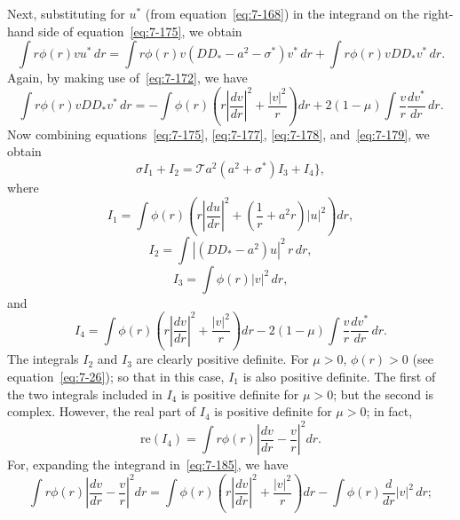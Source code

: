 Next, substituting for $u^*$ (from equation~\eqref{eq:7-168}) in the integrand on
the right-hand side of equation~\eqref{eq:7-175}, we obtain
\begin{equation}
\label{eq:7-178}
\int r\phi(r)vu^*\,dr
= \int r\phi(r) v(DD_*-a^2-\sigma^*)v^*\,dr
+ \int r\phi(r)vDD_*v^*\,dr.
\end{equation}
Again, by making use of~\eqref{eq:7-172}, we have
\begin{equation}
\label{eq:7-179}
\int r\phi(r)v DD_*v^*\,dr
= -\int \phi(r)\!\left(r\left|\frac{dv}{dr}\right|^2
+ \frac{|v|^2}{r}\right)dr
+ 2(1-\mu)\int \frac{v}{r}\frac{dv^*}{dr}\,dr.
\end{equation}
Now combining equations~\eqref{eq:7-175}, \eqref{eq:7-177}, \eqref{eq:7-178}, and~\eqref{eq:7-179}, we obtain
\begin{equation}
\label{eq:7-180}
\sigma I_1 + I_2 = \mathscr{T}a^2(a^2+\sigma^*)I_3 + I_4\},
\end{equation}
where
\begin{equation}
\label{eq:7-181}
I_1 = \int \phi(r)\!\left(r\left|\frac{du}{dr}\right|^2
+ \left(\frac{1}{r}+a^2 r\right)|u|^2\right)dr,
\end{equation}
\begin{equation}
\label{eq:7-182}
I_2 = \int |(DD_*-a^2)u|^2\,r\,dr,
\end{equation}
\begin{equation}
\label{eq:7-183}
I_3 = \int \phi(r)|v|^2\,dr,
\end{equation}
and
\begin{equation}
\label{eq:7-184}
I_4 = \int \phi(r)\!\left(r\left|\frac{dv}{dr}\right|^2
+ \frac{|v|^2}{r}\right)dr
- 2(1-\mu)\int \frac{v}{r}\frac{dv^*}{dr}\,dr.
\end{equation}
The integrals $I_2$ and $I_3$ are clearly positive definite.  For $\mu > 0$, $\phi(r) > 0$
(see equation~\eqref{eq:7-26}); so that in this case, $I_1$ is also positive definite.  The
first of the two integrals included in $I_4$ is positive definite for $\mu > 0$; but
the second is complex.  However, the real part of $I_4$ is positive definite
for $\mu > 0$; in fact,
\begin{equation}
\label{eq:7-185}
\mathrm{re}(I_4) = \int r\phi(r)\left|\frac{dv}{dr}
- \frac{v}{r}\right|^2 dr.
\end{equation}
For, expanding the integrand in~\eqref{eq:7-185}, we have
\begin{equation}
\label{eq:7-186}
\int r\phi(r)\left|\frac{dv}{dr}
- \frac{v}{r}\right|^2 dr
= \int \phi(r)\!\left(r\left|\frac{dv}{dr}\right|^2
+ \frac{|v|^2}{r}\right)dr
- \int \phi(r)\frac{d}{dr}|v|^2\,dr;
\end{equation}
